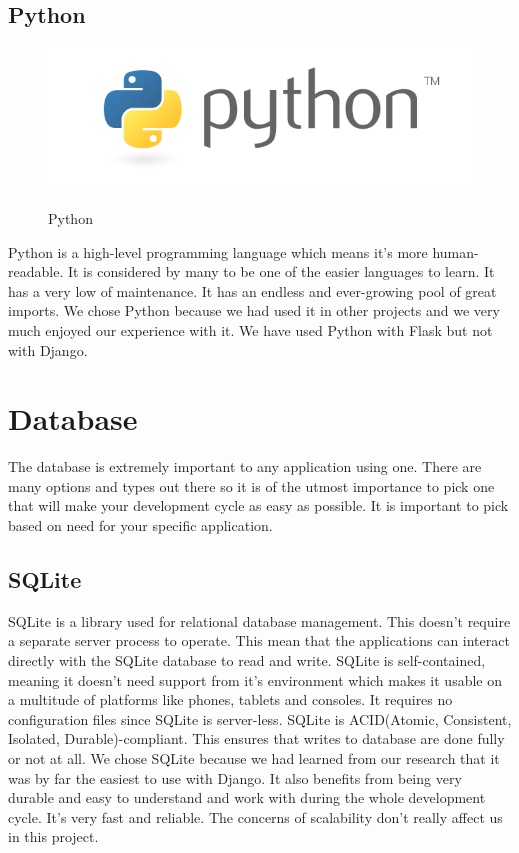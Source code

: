 \subsection{Python}
\begin{figure}
\includegraphics[scale=0.25]{img/python.png}
\caption{Python}
\cite{python.org}
\end{figure}
Python is a high-level programming language which means it's more human-readable. It is considered by many to be one of the easier languages to learn. It has a very low of maintenance. It has an endless and ever-growing pool of great imports.
We chose Python because we had used it in other projects and we very much enjoyed our experience with it. We have used Python with Flask but not with Django.

\section{Database}
The database is extremely important to any application using one. There are many options and types out there so it is of the utmost importance to pick one that will make your development cycle as easy as possible. It is important to pick based on need for your specific application.
\newpage
\subsection{SQLite}
SQLite is a library used for relational database management. This doesn't require a separate server process to operate. This mean that the applications can interact directly with the SQLite database to read and write. SQLite is self-contained, meaning it doesn't need support from it's environment which makes it usable on a multitude of platforms like phones, tablets and consoles. It requires no configuration files since SQLite is server-less. SQLite is ACID(Atomic, Consistent, Isolated, Durable)-compliant. This ensures that writes to database are done fully or not at all.
We chose SQLite because we had learned from our research that it was by far the easiest to use with Django. It also benefits from being very durable and easy to understand and work with during the whole development cycle\cite{sqlite}. It's very fast and reliable. The concerns of scalability don't really affect us in this project.

